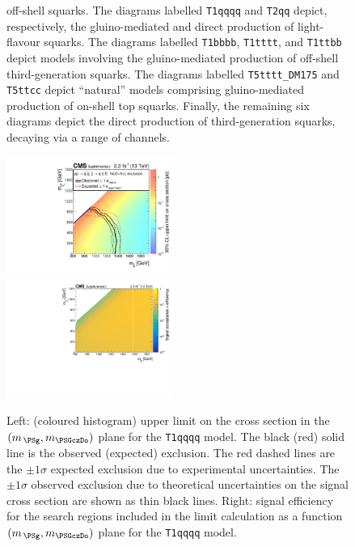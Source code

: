 \begin{figure}[!h]
\begin{center}
{     off-shell squarks. The diagrams labelled \texttt{T1qqqq} and
     \texttt{T2qq} depict, respectively, the gluino-mediated and
     direct production of light-flavour squarks. The diagrams labelled
     \texttt{T1bbbb}, \texttt{T1tttt}, and \texttt{T1ttbb} depict
     models involving the gluino-mediated production of off-shell
     third-generation squarks. The diagrams labelled
     \texttt{T5tttt\_DM175} and \texttt{T5ttcc} depict ``natural''
     models comprising gluino-mediated production of on-shell top
     squarks. Finally, the remaining six diagrams depict the direct
     production of third-generation squarks, decaying via a range of
     channels.  }
   \label{fig:simplified-models}
 \end{center}
\end{figure}


\clearpage
\begin{figure}[!h]
  \begin{center}
    \includegraphics[width=0.49\textwidth]{Supplementary/RA1T1qqqqXSEC_aux} \, 
    \includegraphics[width=0.49\textwidth]{Supplementary/T1qqqq_merging_4_cats_aux} \,     
  \end{center}
  \caption{Left: (coloured histogram) upper limit on the cross section in the $(m_{\,\PSg}, m_{\PSGczDo})$ plane for the \texttt{T1qqqq} model. 
  The black (red) solid line is the observed (expected) exclusion. The red dashed lines are the $\pm1\sigma$ expected exclusion due to experimental uncertainties. 
  The $\pm1\sigma$ observed exclusion due to theoretical uncertainties on the signal cross section are shown as thin black lines. 
  Right: signal efficiency for the search regions included in the limit calculation as a function $(m_{\,\PSg}, m_{\PSGczDo})$ plane for the \texttt{T1qqqq} model. 
  \label{fig:T1qqqq_excl}}
\end{figure}

